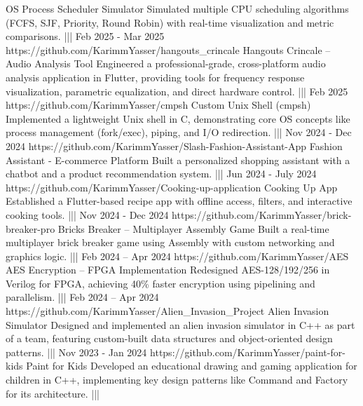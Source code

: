 {    {OS Process Scheduler Simulator}%
    {Simulated multiple CPU scheduling algorithms (FCFS, SJF, Priority, Round Robin) with real-time visualization and metric comparisons.}%
    |||
    {Feb 2025 - Mar 2025}%
    {https://github.com/KarimmYasser/hangouts_crincale}%
    {Hangouts Crincale – Audio Analysis Tool}%
    {Engineered a professional-grade, cross-platform audio analysis application in Flutter, providing tools for frequency response visualization, parametric equalization, and direct hardware control.}%
    |||
    {Feb 2025}%
    {https://github.com/KarimmYasser/cmpsh}%
    {Custom Unix Shell (cmpsh)}%
    {Implemented a lightweight Unix shell in C, demonstrating core OS concepts like process management (fork/exec), piping, and I/O redirection.}%
    |||
    {Nov 2024 - Dec 2024}%
    {https://github.com/KarimmYasser/Slash-Fashion-Assistant-App}%
    {Fashion Assistant - E-commerce Platform}%
    {Built a personalized shopping assistant with a chatbot and a product recommendation system.}%
    |||
    {Jun 2024 - July 2024}%
    {https://github.com/KarimmYasser/Cooking-up-application}%
    {Cooking Up App}%
    {Established a Flutter-based recipe app with offline access, filters, and interactive cooking tools.}%
    |||
    {Nov 2024 - Dec 2024}%
    {https://github.com/KarimmYasser/brick-breaker-pro}%
    {Bricks Breaker – Multiplayer Assembly Game}%
    {Built a real-time multiplayer brick breaker game using Assembly with custom networking and graphics logic.}%
    |||
    {Feb 2024 – Apr 2024}%
    {https://github.com/KarimmYasser/AES}%
    {AES Encryption – FPGA Implementation}%
    {Redesigned AES-128/192/256 in Verilog for FPGA, achieving 40\% faster encryption using pipelining and parallelism.}%
    |||
    {Feb 2024 – Apr 2024}%
    {https://github.com/KarimmYasser/Alien_Invasion_Project}%
    {Alien Invasion Simulator}%
    {Designed and implemented an alien invasion simulator in C++ as part of a team, featuring custom-built data structures and object-oriented design patterns.}%
    |||
    {Nov 2023 - Jan 2024}%
    {https://github.com/KarimmYasser/paint-for-kids}%
    {Paint for Kids}%
    {Developed an educational drawing and gaming application for children in C++, implementing key design patterns like Command and Factory for its architecture.}%
    |||%
}



